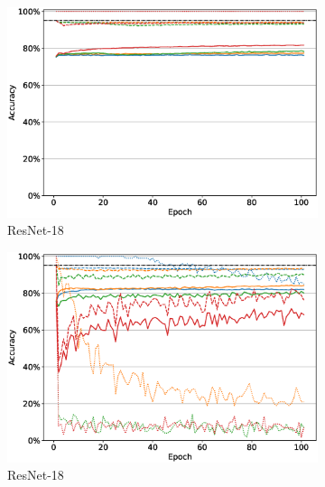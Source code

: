 \begin{figure}
     \centering
     \begin{subfigure}[b]{0.49\textwidth}
         \centering
         \includegraphics[width=\textwidth]{images/finetuning/finetuning_protecting_content_smalllr_thesis_resnet18.eps}
         \caption{ResNet-18}
         \label{fig:finetuning_resnet18_smalllr}
     \end{subfigure}
     \hfill
     \begin{subfigure}[b]{0.49\textwidth}
         \centering
         \includegraphics[width=\textwidth]{images/finetuning/finetuning_protecting_content_largelr_thesis_resnet18.eps}
         \caption{ResNet-18}
         \label{fig:finetuning_resnet18_largelr}
     \end{subfigure}
     \begin{subfigure}[b]{0.49\textwidth}
         \centering

\end{subfigure}
\end{figure}
